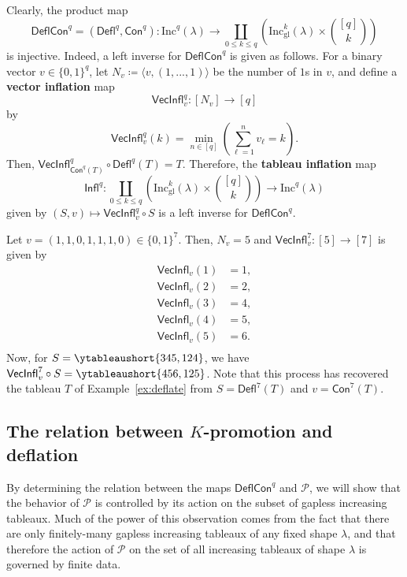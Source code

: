 \documentclass[12pt]{amsart}
\theoremstyle{definition}
\newenvironment{example}
  {\pushQED{\qed}\renewcommand{\qedsymbol}{$\diamondsuit$}\examplex}
  {\popQED\endexamplex}
\theoremstyle{remark}
\numberwithin{equation}{section}
\newcommand{\inc}{\ensuremath{\mathrm{Inc}}}
\newcommand{\incgl}{\inc_{\mathrm{gl}}}
\newcommand{\pro}{\mathcal{P}}
\newcommand{\deflate}{\ensuremath{\mathsf{Defl}}}
\newcommand{\inflate}{\ensuremath{\mathsf{VecInfl}}}
\newcommand{\tinflate}{\ensuremath{\mathsf{Infl}}}
\newcommand{\content}{\ensuremath{\mathsf{Con}}}
\newcommand{\compress}{\ensuremath{\mathsf{DeflCon}}}
\begin{document}
Clearly, the product map 
\[
\compress^q = (\deflate^q,\content^q) : \inc^q(\lambda) \to \coprod_{0 \leq k \leq q} \left( \incgl^k(\lambda) \times \binom{[q]}{k} \right)
\] 
is injective.
Indeed, a left inverse for $\compress^q$ is given as follows. 
For a binary vector $v \in \{0,1\}^{q}$, let $N_v \coloneqq \langle v, (1,...,1) \rangle$ be the number of $1$s in $v$, and define a {\bf vector inflation} map \[\inflate^q_v : [N_v] \to [q]\] by
\[ \inflate^q_v(k) = \min_{n \in [q]} \left( \sum_{\ell = 1}^n v_\ell = k \right).\] Then, $\inflate^q_{\content^q(T)} \circ \deflate^q(T) = T$. Therefore, the {\bf tableau inflation} map 
\[
\tinflate^q : \coprod_{0 \leq k \leq q} \left( \incgl^k(\lambda) \times \binom{[q]}{k} \right) \to \inc^q(\lambda)
\]
given by 
$(S,v) \mapsto \inflate^q_v \circ S$ is a left inverse for $\compress^q$. 

\begin{example}\label{ex:reinflate}
Let $v = (1,1,0,1,1,1,0) \in \{0,1\}^7$. Then, $N_v = 5$ and $\inflate^7_v : [5] \to [7]$ is given by 
\begin{align*}
\inflate_v(1) &= 1, \\
\inflate_v(2) &= 2, \\
\inflate_v(3) &= 4, \\
\inflate_v(4) &= 5, \\
\inflate_v(5) &= 6. \\
\end{align*}
Now, for $S = \ytableaushort{345,124}$, we have $\inflate^7_v \circ S = \ytableaushort{456,125}$. Note that this process has recovered the tableau $T$ of Example~\ref{ex:deflate} from $S=\deflate^7(T)$ and $v=\content^7(T)$.
\end{example}

\subsection{The relation between $K$-promotion and deflation}
By determining the relation between the maps $\compress^q$ and $\pro$, we will show that the behavior of $\pro$ is controlled by its action on the subset of gapless increasing tableaux. Much of the power of this observation comes from the fact that there are only finitely-many gapless increasing tableaux of any fixed shape $\lambda$, and that therefore the action of $\pro$ on the set of all increasing tableaux of shape $\lambda$ is governed by finite data.
\end{document}
